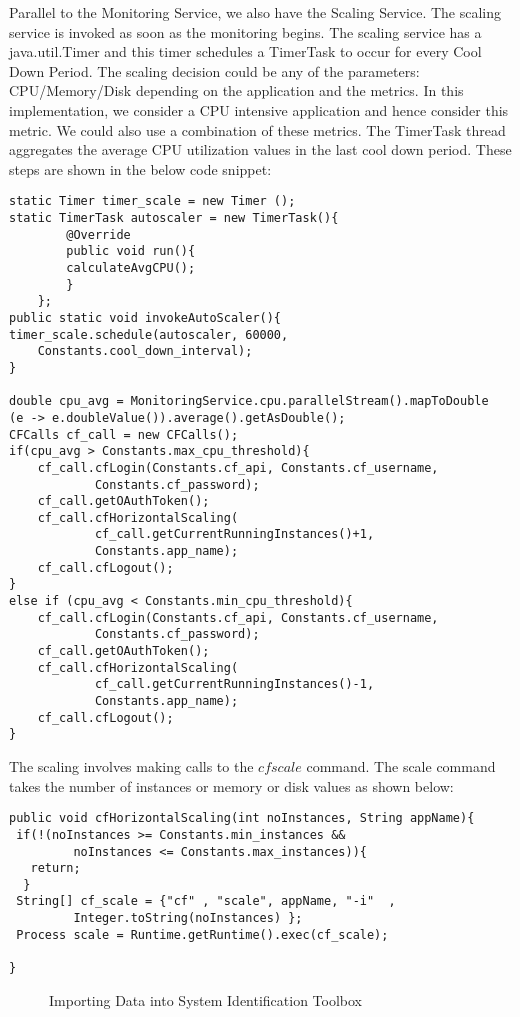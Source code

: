 \documentclass[article,type=msc,colorback,12pt,accentcolor=tud7b,table]{tudthesis}
\begin{document}
	Parallel to the Monitoring Service, we also have the Scaling Service. The scaling service is invoked as soon as the monitoring begins. The scaling service has a java.util.Timer and this timer schedules a TimerTask to occur for every Cool Down Period. The scaling decision could be any of the parameters: CPU/Memory/Disk depending on the application and the metrics. In this implementation, we consider a CPU intensive application and hence consider this metric. We could also use a combination of these metrics. The TimerTask thread aggregates the average CPU utilization values in the last cool down period. These steps are shown in the below code snippet:
\begin{lstlisting}
static Timer timer_scale = new Timer ();
static TimerTask autoscaler = new TimerTask(){
	 	@Override
	 	public void run(){
	 	calculateAvgCPU();
	 	}
 	};
public static void invokeAutoScaler(){
timer_scale.schedule(autoscaler, 60000, 
	Constants.cool_down_interval);
}

double cpu_avg = MonitoringService.cpu.parallelStream().mapToDouble
(e -> e.doubleValue()).average().getAsDouble();
CFCalls cf_call = new CFCalls();
if(cpu_avg > Constants.max_cpu_threshold){
	cf_call.cfLogin(Constants.cf_api, Constants.cf_username, 
			Constants.cf_password);
	cf_call.getOAuthToken();
	cf_call.cfHorizontalScaling(
			cf_call.getCurrentRunningInstances()+1, 
			Constants.app_name);
	cf_call.cfLogout();
}
else if (cpu_avg < Constants.min_cpu_threshold){
	cf_call.cfLogin(Constants.cf_api, Constants.cf_username, 
			Constants.cf_password);
	cf_call.getOAuthToken();
	cf_call.cfHorizontalScaling(
			cf_call.getCurrentRunningInstances()-1, 
			Constants.app_name);
	cf_call.cfLogout();
}
\end{lstlisting}
	The scaling involves making calls to the $cf scale$ command. The scale command takes the number of instances or memory or disk values as shown below:
	\begin{lstlisting}
public void cfHorizontalScaling(int noInstances, String appName){
 if(!(noInstances >= Constants.min_instances && 
		 noInstances <= Constants.max_instances)){
   return;
  }
 String[] cf_scale = {"cf" , "scale", appName, "-i"  , 
		 Integer.toString(noInstances) };
 Process scale = Runtime.getRuntime().exec(cf_scale);

}	
	\end{lstlisting}
	  \begin{figure}[h]
	  	\begin{center}
	  		\makebox[\textwidth]{\texttt{[image: D6]}}
	  	\end{center}
	  	\caption{Importing Data into System Identification Toolbox}
	  \end{figure}	
	
\end{document}
